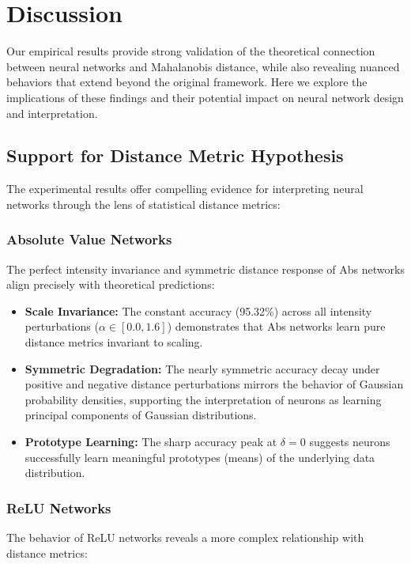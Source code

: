 \section{Discussion}

Our empirical results provide strong validation of the theoretical connection between neural networks and Mahalanobis distance, while also revealing nuanced behaviors that extend beyond the original framework. Here we explore the implications of these findings and their potential impact on neural network design and interpretation.

\subsection{Support for Distance Metric Hypothesis}

The experimental results offer compelling evidence for interpreting neural networks through the lens of statistical distance metrics:

\subsubsection{Absolute Value Networks}
The perfect intensity invariance and symmetric distance response of Abs networks align precisely with theoretical predictions:

\begin{itemize}
    \item \textbf{Scale Invariance:} The constant accuracy (95.32\%) across all intensity perturbations ($\alpha \in [0.0, 1.6]$) demonstrates that Abs networks learn pure distance metrics invariant to scaling.
    
    \item \textbf{Symmetric Degradation:} The nearly symmetric accuracy decay under positive and negative distance perturbations mirrors the behavior of Gaussian probability densities, supporting the interpretation of neurons as learning principal components of Gaussian distributions.
    
    \item \textbf{Prototype Learning:} The sharp accuracy peak at $\delta = 0$ suggests neurons successfully learn meaningful prototypes (means) of the underlying data distribution.
\end{itemize}

\subsubsection{ReLU Networks}
The behavior of ReLU networks reveals a more complex relationship with distance metrics:

